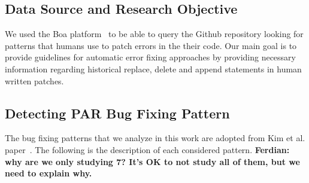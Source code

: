 \documentclass{sig-alternate-05-2015}
\newcommand{\todo}[1]
  {{\scriptsize \textbf{\color{red} {#1}}}}
\begin{document}
\subsection{Data Source and Research Objective}
We used the Boa platform~\cite{dyer2013} to be able to query the Github repository
looking for patterns that humans use to patch errors in the their code. Our main
goal is to provide guidelines for automatic error fixing approaches by providing
necessary information regarding historical replace, delete and append statements
in human written patches. 

\subsection{Detecting PAR Bug Fixing Pattern}\label{sec:method}
The bug fixing patterns that we analyze in this work are adopted from Kim et
al. paper~\cite{kim2013}. The following is the description of each considered
pattern. 
\todo{Ferdian: why are we only studying 7?  It's OK to not study all of them,
  but we need to explain why.}
\end{document}
